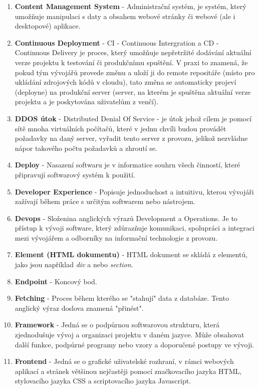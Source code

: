 \documentclass[12pt,a4paper]{report}
\begin{document}
\begin{enumerate}
    \item \textbf{Content Management System} - Administrační systém, je systém, který umožňuje manipulaci s daty a obsahem webové stránky či webové (ale i desktopové) aplikace.
    \item \textbf{Continuous Deployment} - CI - Continuous Intergration a CD - Continuous Delivery je proces, který umožňuje nepřetržité dodávání aktuální verze projektu k testování či produkčnímu spuštění. V praxi to znamená, že pokud tým vývojářů provede změnu a uloží ji do remote repositáře (místo pro ukládání zdrojových kódů v cloudu), tato změna se automaticky projeví (deployne) na produkční server (server, na kterém je spuštěna aktuální verze projektu a je poskytována uživatelům z venčí).
    \item \textbf{DDOS útok} - Distributed Denial Of Service - je útok jehož cílem je pomocí sítě mnoha virtuálních počítačů, které v jednu chvíli budou provádět požadavky na daný server, vyřadit tento server z provozu, jelikož nezvládne nápor takového počtu požadavků a zhroutí se.
    \item \textbf{Deploy} - Nasazení softwaru je v informatice souhrn všech činností, které připravují softwarový systém k použití.
    \item \textbf{Developer Experience} - Popisuje jednoduchost a intuitivu, kterou vývojáři zažívají během práce s určitým softwarem nebo nástrojem.
    \item \textbf{Devops} - Složenina anglických výrazů Development a Operations. Je to přístup k vývoji software, který zdůrazňuje komunikaci, spolupráci a integraci mezi vývojářem a odborníky na informační technologie z provozu. 
    \item \textbf{Element (HTML dokumentu)} - HTML dokument se skládá z elementů, jako jsou například \emph{div} a nebo \emph{section}.
    \item \textbf{Endpoint} - Koncový bod. 
    \item \textbf{Fetching} - Proces během kterého se "stahují" data z databáze. Tento anglický výraz doslova znamená "přinést".
    \item \textbf{Framework} - Jedná se o podpůrnou softwarovou strukturu, která zjednodušuje vývoj a organizaci projektu v daném jazyce. Může obsahovat další funkce, podpůrné programy nebo vzory a doporučené postupy ve vývoji.
    \item \textbf{Frontend} - Jedná se o grafické uživatelské rozhraní, v rámci webových aplikací a stránek většinou nejčastěji pomocí značkovacího jazyka HTML, stylovacího jazyka CSS a scriptovacího jazyka Javascript.

\end{enumerate}
\end{document}
